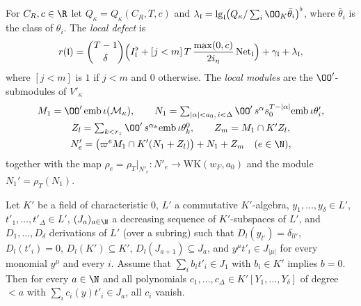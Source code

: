 \begin{definition}\label{pf:onto1:rLa}
For $C_R,c\in\R$ let $Q_\kappa=Q_\kappa(C_R,T,c)$ and $\lambda_{\mathfrak l}=\ontoonelg_{\mathfrak l}\bigl(Q_\kappa/\sum_i\OO_K\bar
\theta_i\bigr)^\flat$, where $\bar\theta_i$ is the class of $\theta_i$. The \emph{local defect} is
\[
r(\mathfrak l)=\binom{T-1}{\delta}\Bigl(I_{\mathfrak l}^\flat+[j<m]\,T\,\frac{\max(0,c)}{2i_\eta}\,\mathrm{Net}_{\mathfrak l}\Bigr)
+\gamma_{\mathfrak l}+\lambda_{\mathfrak l},
\]
where $[j<m]$ is $1$ if $j<m$ and $0$ otherwise. The \emph{local modules} are the $\OO'$-submodules of $V'_\kappa$
\begin{gather*}
M_1=\OO'\,\mathrm{emb}\,\iota(\mathcal M_\kappa),\qquad
N_1=\textstyle\sum_{|\alpha|<a_0,\,i<\Delta}\OO'\,s^\alpha s_0^{T-|\alpha|}\mathrm{emb}\,\iota\theta'_i,\\
Z_l=\textstyle\sum_{k<r_z}\OO'\,s^{\alpha_k}\mathrm{emb}\,\iota\theta^0_k,\qquad Z_m=M_1\cap K'Z_l,\\
N'_e=\bigl(\varpi^eM_1\cap K'(N_1+Z_l)\bigr)+N_1+Z_m\quad(e\in\N),
\end{gather*}
together with the map $\rho_e=\rho_T|_{N'_e}\colon N'_e\to\mathrm{WK}(w_F,a_0)$ and the module $N_1'=\rho_T(N_1)$.
\end{definition}

\begin{lemma}\label{pf:onto1:ind_claim}
Let $K'$ be a field of characteristic $0$, $L'$ a commutative $K'$-algebra, $y_1,\dots,y_\delta\in L'$, $t'_1,\dots,t'_\Delta\in
L'$, $(J_a)_{a\in\N}$ a decreasing sequence of $K'$-subspaces of $L'$, and $D_1,\dots,D_\delta$ derivations of $L'$ (over a
subring) such that $D_l(y_{l'})=\delta_{ll'}$, $D_l(t'_i)=0$, $D_l(K')\subseteq K'$, $D_l(J_{a+1})\subseteq J_a$, and
$y^\mu t'_i\in J_{|\mu|}$ for every monomial $y^\mu$ and every $i$. Assume that $\sum_ib_it'_i\in J_1$ with $b_i\in K'$ implies
$b=0$. Then for every $a\in\N$ and all polynomials $c_1,\dots,c_\Delta\in K'[Y_1,\dots,Y_\delta]$ of degree $<a$ with
$\sum_ic_i(y)t'_i\in J_a$, all $c_i$ vanish.
\end{lemma}

